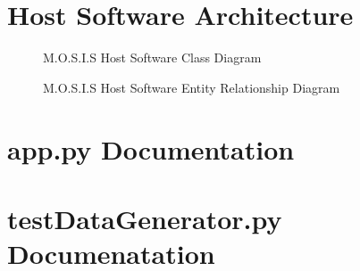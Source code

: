 \documentclass[12pt]{article}
\begin{document}
\section{Host Software Architecture}
\begin{figure}[H]
	\caption{M.O.S.I.S Host Software Class Diagram}
\end{figure}
\begin{figure}[H]
	\caption{M.O.S.I.S Host Software Entity Relationship Diagram}
\end{figure}
\section{app.py Documentation}

\section{testDataGenerator.py Documenatation}

\end{document}
